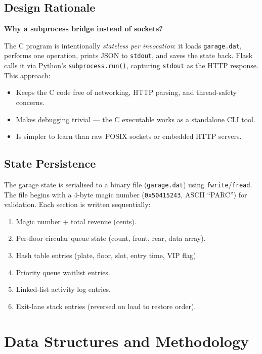\documentclass[12pt, a4paper]{report}
\begin{document}
\section{Design Rationale}

\textbf{Why a subprocess bridge instead of sockets?}

The C program is intentionally \emph{stateless per invocation}: it loads
\texttt{garage.dat}, performs one operation, prints JSON to
\texttt{stdout}, and saves the state back.  Flask calls it via Python's
\texttt{subprocess.run()}, capturing \texttt{stdout} as the HTTP
response.  This approach:

\begin{itemize}[nosep]
  \item Keeps the C code free of networking, HTTP parsing, and
        thread-safety concerns.
  \item Makes debugging trivial --- the C executable works as a
        standalone CLI tool.
  \item Is simpler to learn than raw POSIX sockets or embedded HTTP
        servers.
\end{itemize}

\section{State Persistence}

The garage state is serialised to a binary file (\texttt{garage.dat})
using \texttt{fwrite}/\texttt{fread}.  The file begins with a 4-byte
magic number (\texttt{0x50415243}, ASCII ``PARC'') for validation.  Each
section is written sequentially:

\begin{enumerate}[nosep]
  \item Magic number + total revenue (cents).
  \item Per-floor circular queue state (count, front, rear, data array).
  \item Hash table entries (plate, floor, slot, entry time, VIP flag).
  \item Priority queue waitlist entries.
  \item Linked-list activity log entries.
  \item Exit-lane stack entries (reversed on load to restore order).
\end{enumerate}

\chapter{Data Structures and Methodology}
\end{document}
